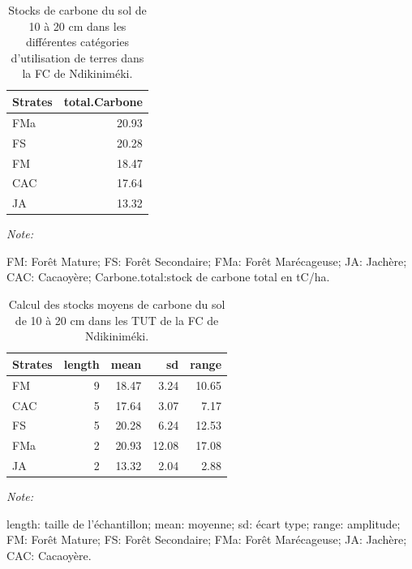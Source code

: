 \documentclass[
  12pt,
  a4paper,
  extrafontsizes,
  onecolumn,
  openright]{book}
\theoremstyle{definition}
\theoremstyle{definition}
\theoremstyle{definition}
\theoremstyle{definition}
\theoremstyle{remark}
\begin{document}
\begin{table}[H]
\centering
\caption{\label{tab:Stockscarbonesolde10-20cmNdikinimeki3}Stocks de carbone du sol de 10 à 20 cm dans les différentes catégories d'utilisation de terres dans la FC de Ndikiniméki.}
\centering
\begin{threeparttable}
\begin{tabular}[t]{lr}
\toprule
Strates & total.Carbone\\
\midrule
FMa & 20.93\\
FS & 20.28\\
FM & 18.47\\
CAC & 17.64\\
JA & 13.32\\
\bottomrule
\end{tabular}
\begin{tablenotes}
\item \textit{Note: } 
\item FM: Forêt Mature; FS: Forêt Secondaire; FMa: Forêt Marécageuse; JA: Jachère; CAC: Cacaoyère; Carbone.total:stock de carbone total en tC/ha.
\end{tablenotes}
\end{threeparttable}
\end{table}

\begin{table}[H]
\centering
\caption{\label{tab:Stocksmoyenssol10-20cmFCNdikinimeki}Calcul des stocks moyens de carbone du sol de 10 à 20 cm dans les TUT de la FC de Ndikiniméki.}
\centering
\begin{threeparttable}
\begin{tabular}[t]{lrrrr}
\toprule
Strates & length & mean & sd & range\\
\midrule
FM & 9 & 18.47 & 3.24 & 10.65\\
CAC & 5 & 17.64 & 3.07 & 7.17\\
FS & 5 & 20.28 & 6.24 & 12.53\\
FMa & 2 & 20.93 & 12.08 & 17.08\\
JA & 2 & 13.32 & 2.04 & 2.88\\
\bottomrule
\end{tabular}
\begin{tablenotes}
\item \textit{Note: } 
\item length: taille de l'échantillon; mean: moyenne; sd: écart type; range: amplitude; FM: Forêt Mature; FS: Forêt Secondaire; FMa: Forêt Marécageuse; JA: Jachère; CAC: Cacaoyère.
\end{tablenotes}
\end{threeparttable}
\end{table}
\end{document}
